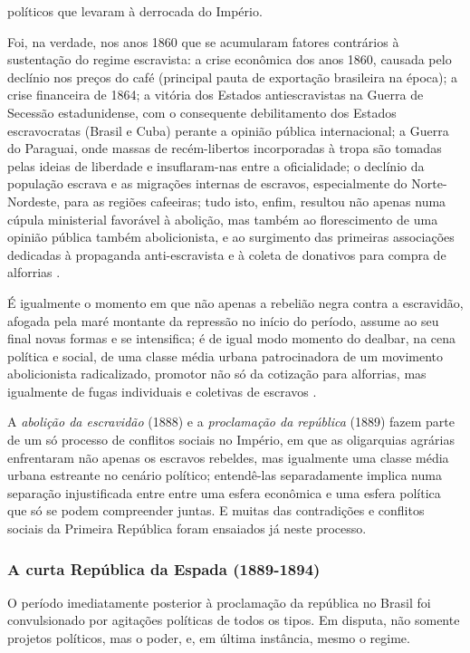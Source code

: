 políticos que levaram à derrocada do Império. 

Foi, na verdade, nos anos 1860 que se acumularam fatores contrários à sustentação do regime escravista: a crise econômica dos anos 1860, causada pelo declínio nos preços do café (principal pauta de exportação brasileira na época); a crise financeira de 1864; a vitória dos Estados antiescravistas na Guerra de Secessão estadunidense, com o consequente debilitamento dos Estados escravocratas (Brasil e Cuba) perante a opinião pública internacional; a Guerra do Paraguai, onde massas de recém-libertos incorporadas à tropa são tomadas pelas ideias de liberdade e insuflaram-nas entre a oficialidade; o declínio da população escrava e as migrações internas de escravos, especialmente do Norte-Nordeste, para as regiões cafeeiras; tudo isto, enfim, resultou não apenas numa cúpula ministerial favorável à abolição, mas também ao florescimento de uma opinião pública também abolicionista, e ao surgimento das primeiras associações dedicadas à propaganda anti-escravista e à coleta de donativos para compra de alforrias \cite[p.~141-143]{gorender_escrareab_1990}.

É igualmente o momento em que não apenas a rebelião negra contra a escravidão, afogada pela maré montante da repressão no início do período, assume ao seu final novas formas e se intensifica; é de igual modo momento do dealbar, na cena política e social, de uma classe média urbana patrocinadora de um movimento abolicionista radicalizado, promotor não só da cotização para alforrias, mas igualmente de fugas individuais e coletivas de escravos \cite[p.~267-336]{saes_estadoburgues_1985}.

A \textit{abolição da escravidão} (1888) e a \textit{proclamação da república} (1889) fazem parte de um só processo de conflitos sociais no Império, em que as oligarquias agrárias enfrentaram não apenas os escravos rebeldes, mas igualmente uma classe média urbana estreante no cenário político; entendê-las separadamente implica numa separação injustificada entre entre uma esfera econômica e uma esfera política que só se podem compreender juntas. E muitas das contradições e conflitos sociais da Primeira República foram ensaiados já neste processo.

\subsubsection{A curta República da Espada (1889-1894)}\label{subsubsec:espada}

O período imediatamente posterior à proclamação da república no Brasil foi convulsionado por agitações políticas de todos os tipos. Em disputa, não somente projetos políticos, mas o poder, e, em última instância, mesmo o regime.

